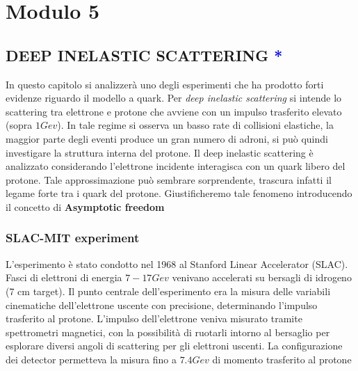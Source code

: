 \chapter{Modulo 5}\label{cap : Mod5}

\section{DEEP INELASTIC SCATTERING \textcolor{blue}{*}}

In questo capitolo si analizzerà uno degli esperimenti che ha prodotto forti evidenze riguardo il modello a quark. Per \textit{deep inelastic scattering} si intende lo scattering tra elettrone e protone che avviene con un impulso trasferito elevato (sopra $1 Gev$). In tale regime si osserva un basso rate di collisioni elastiche, la maggior parte degli eventi produce un gran numero di adroni, si può quindi investigare la struttura interna del protone. Il deep inelastic scattering è analizzato considerando l'elettrone incidente interagisca con un quark libero del protone. Tale approssimazione può sembrare sorprendente, trascura infatti il legame forte tra i quark del protone. Giustificheremo tale fenomeno introducendo il concetto di \textbf{Asymptotic freedom} 

\subsection{SLAC-MIT experiment}

L'esperimento è stato condotto nel 1968 al Stanford Linear Accelerator (SLAC). Fasci di elettroni di energia $7-17 Gev$ venivano accelerati su bersagli di idrogeno (7 cm target). Il punto centrale dell'esperimento era la misura delle variabili cinematiche dell'elettrone uscente con precisione, determinando l'impulso trasferito al protone. L'impulso dell'elettrone veniva misurato tramite spettrometri magnetici, con la possibilità di ruotarli intorno al bersaglio per esplorare diversi angoli di scattering per gli elettroni uscenti. La configurazione dei detector permetteva la misura fino a $7.4 Gev$ di momento trasferito al protone

